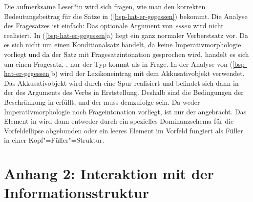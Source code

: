 Die aufmerksame Leser*in wird sich fragen, wie man den korrekten Bedeutungsbeitrag für die Sätze in
(\ref{bsp-hat-er-gegessen}) bekommt. Die Analyse des Fragesatzes ist einfach: Das optionale Argument
von \emph{essen} wird nicht realisiert. In (\ref{bsp-hat-er-gegessen}a) liegt ein ganz normaler Verberstsatz
vor. Da es sich nicht um einen Konditionalsatz handelt, da keine Imperativmorphologie vorliegt
und da der Satz mit Fragesatzintonation gesprochen wird, handelt es sich um einen Fragesatz,
\dash, nur der Typ  kommt als \modew in Frage. In der Analyse von
(\ref{bsp-hat-er-gegessen}b) wird der Lexikoneintrag mit dem Akkusativobjekt verwendet. Das Akkusativobjekt
wird durch eine Spur realisiert und befindet sich dann in der \slashl des Arguments des Verbs
in Erststellung. Deshalb sind die Bedingungen der Beschränkung in  erfüllt, und
der \modew muss demzufolge  sein.
Da weder Imperativmorphologie noch Frageintonation vorliegt, ist nur der \modew {}
angebracht. Das Element in \slasch wird dann entweder durch ein spezielles Dominanzschema für
die Vorfeldellipse abgebunden \citep*{Mueller2004e,VMY2024a} oder ein leeres Element im Vorfeld
fungiert als Füller in einer Kopf"=Füller"=Struktur.



\section{Anhang 2: Interaktion mit der Informationsstruktur}
\label{sec-udc-is}

